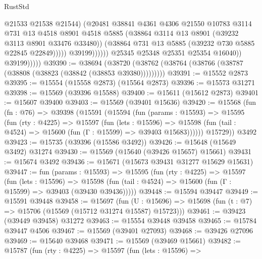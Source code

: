 \begin{lexlean}{RustStd}
\begin{coremodule}
                                    @21533
                                    @21538
                                    @21544)
                                  (@20481
                                    @38841
                                    @4361
                                    @4306
                                    @21550
                                    @10783
                                    @3114
                                    @731
                                    @13
                                    @4518
                                    @8901
                                    @4518
                                    @5885
                                    (@38864 @3114 @13 @8901 (@39232 @3113 @8901 @33476 @33480))
                                    (@38864 @731 @13 @5885 (@39232 @730 @5885 @22845 @22849)))))
                              @39199))))))
                  @25345
                  @25348
                  @25351
                  @25354
                  @16040))
              @39199)))))
@39390 := @38694
    (@38720 (@38762 (@38764 (@38766 (@38787 (@38808 (@38823 (@38842 (@38853 @39380)))))))))
@39391 := @15552 @2873
@39395 := @15554 (@15558 @2873) (@15564 @2873)
@39396 := @15573 @31271
@39398 := @15569 (@39396 @15588)
@39400 := @15611 (@15612 @2873)
@39401 := @15607 @39400
@39403 := @15569 (@39401 @15636)
@39420 := @15568
    (fun (fn : @76) =>
    @39398
      (@15591
        (@15594
          (fun (params : @15593) =>
          @15595
            (fun (rty : @4225) =>
            @15597
              (fun (lets : @15596) =>
              @15598 (fun (tail : @4524) => @15600 (fun (Γ : @15599) => @39403 @15683))))))
        @15729))
    @3492
@39423 := @15735 (@39396 (@15586 @3492))
@39426 := @15648 (@15649 @3492) @31274
@39430 := @15569 (@15640 (@39426 @15657) @15661)
@39431 := @15674 @3492
@39436 := @15671 (@15673 @39431 @31277 @15629 @15631)
@39447 := fun (params : @15593) =>
  @15595
    (fun (rty : @4225) =>
    @15597
      (fun (lets : @15596) =>
      @15598 (fun (tail : @4524) => @15600 (fun (Γ : @15599) => @39403 (@39430 @39436)))))
@39448 := @15594 @39447
@39449 := @15591 @39448
@39458 := @15697
    (fun (U : @15696) => @15698 (fun (t : @7) => @15706 (@15569 (@15712 @31274 @15587) @15723)))
@39461 := @39423 (@39449 @39458) @31272
@39463 := @15554 @39448 @39458
@39465 := @15784 @39447 @4506
@39467 := @15569 (@39401 @27093)
@39468 := @39426 @27096
@39469 := @15640 @39468
@39471 := @15569 (@39469 @15661)
@39482 := @15787
    (fun (rty : @4225) =>
    @15597
      (fun (lets : @15596) =>

\end{coremodule}
\end{lexlean}
